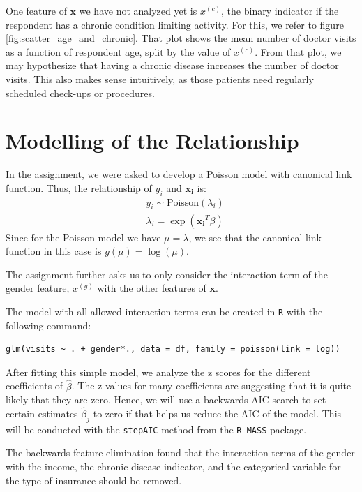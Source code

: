\documentclass[a4paper,11pt]{article}
\begin{document}
One feature of $\mathbf{x}$ we have not analyzed yet is $x^{(c)}$, the binary indicator if the respondent has a chronic condition limiting activity. For this, we refer to figure \ref{fig:scatter_age_and_chronic}.  That plot shows the mean number of doctor visits as a function of respondent age, split by the value of $x^{(c)}$. From that plot, we may hypothesize that having a chronic disease increases the number of doctor visits. This also makes sense intuitively, as those patients need regularly scheduled check-ups or procedures.



\section{Modelling of the Relationship}
In the assignment, we were asked to develop a Poisson model with canonical link function. Thus, the relationship of $y_i$ and $\mathbf{x_i}$ is:
\begin{align}
& y_i \sim \text{Poisson}(\lambda_i) \\
&\lambda_i = \exp(\mathbf{x_i}^T\beta)
    \label{eq:model}
\end{align}
Since for the Poisson model we have $\mu = \lambda$, we see that the canonical link function in this case is $g(\mu) = \log(\mu)$.

The assignment further asks us to only consider the interaction term of the gender feature, $x^{(g)}$ with the other features of $\mathbf{x}$.

The model with all allowed interaction terms can be created in \texttt{R} with the following command:

\begin{verbatim}
glm(visits ~ . + gender*., data = df, family = poisson(link = log))
\end{verbatim}

After fitting this simple model, we analyze the z scores for the different coefficients of $\hat{\beta}$. The z values for many coefficients are suggesting that it is quite likely that they are zero. Hence, we will use a backwards AIC search to set certain estimates $\hat{\beta}_j$ to zero if that helps us reduce the AIC of the model.  This will be conducted with the \texttt{stepAIC} method from the \texttt{R MASS} package.

The backwards feature elimination found that the interaction terms of the gender with the income, the chronic disease indicator, and the categorical variable for the type of insurance should be removed.
\end{document}
